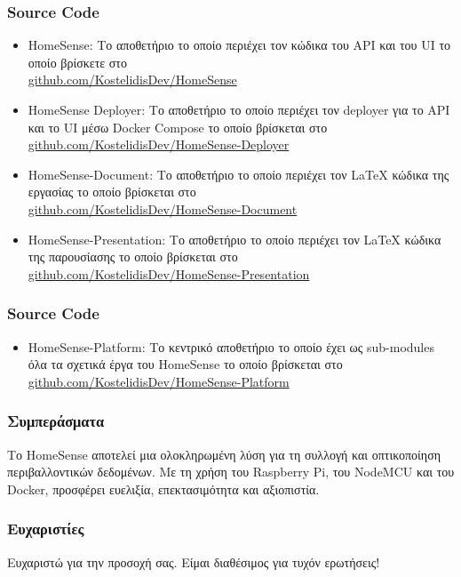 \documentclass{beamer}
\begin{document}
\begin{frame}
\frametitle{Source Code}
\begin{itemize}
	\item HomeSense: Το αποθετήριο το οποίο περιέχει τον κώδικα του API και του UI το οποίο βρίσκετε στο \\
	\href{https://github.com/KostelidisDev/HomeSense}{github.com/KostelidisDev/HomeSense}
	\item HomeSense Deployer: Το αποθετήριο το οποίο περιέχει τον deployer για το API και το UI μέσω Docker Compose το οποίο βρίσκεται στο \\
	\href{https://github.com/KostelidisDev/HomeSense-Deployer}{github.com/KostelidisDev/HomeSense-Deployer}
	\item HomeSense-Document: Το αποθετήριο το οποίο περιέχει τον LaTeX κώδικα της εργασίας το οποίο βρίσκεται στο \\
	\href{https://github.com/KostelidisDev/HomeSense-Document}{github.com/KostelidisDev/HomeSense-Document}
	\item HomeSense-Presentation: Το αποθετήριο το οποίο περιέχει τον LaTeX κώδικα της παρουσίασης το οποίο βρίσκεται στο \\
	\href{https://github.com/KostelidisDev/HomeSense-Presentation}{github.com/KostelidisDev/HomeSense-Presentation}
\end{itemize}
\end{frame}

\begin{frame}
\frametitle{Source Code}
\begin{itemize}
	\item HomeSense-Platform: Το κεντρικό αποθετήριο το οποίο έχει ως sub-modules όλα τα σχετικά έργα του HomeSense το οποίο βρίσκεται στο \\
	\href{https://github.com/KostelidisDev/HomeSense-Platform}{github.com/KostelidisDev/HomeSense-Platform}
\end{itemize}
\end{frame}

\begin{frame}
\frametitle{Συμπεράσματα}
Το HomeSense αποτελεί μια ολοκληρωμένη λύση για τη συλλογή και οπτικοποίηση περιβαλλοντικών δεδομένων. 
Με τη χρήση του Raspberry Pi, του NodeMCU και του Docker, προσφέρει ευελιξία, επεκτασιμότητα και αξιοπιστία.
\end{frame}

\begin{frame}
\frametitle{Ευχαριστίες}
Ευχαριστώ για την προσοχή σας. Είμαι διαθέσιμος για τυχόν ερωτήσεις!
\end{frame}
\end{document}
